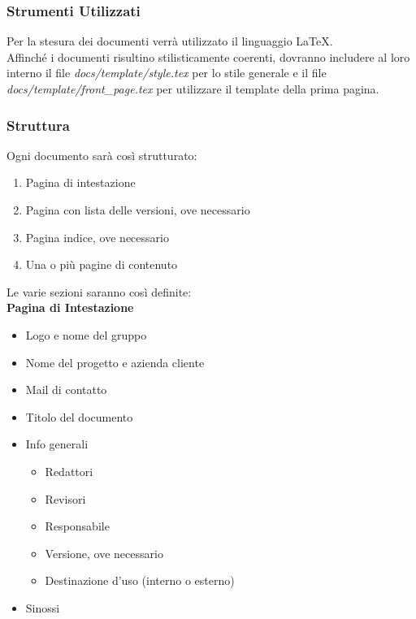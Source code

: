 \documentclass[a4paper, 12pt]{article}
\begin{document}
\subsubsection{Strumenti Utilizzati}
Per la stesura dei documenti verrà utilizzato il linguaggio \LaTeX. \\
Affinché i documenti risultino stilisticamente coerenti, dovranno includere al loro interno il file \textit{docs/template/style.tex} per lo stile generale e il file \textit{docs/template/front\_page.tex} per utilizzare il template della prima pagina.

\subsubsection{Struttura}
Ogni documento sarà così strutturato:
\begin{enumerate}
    \item Pagina di intestazione
    \item Pagina con lista delle versioni, ove necessario
    \item Pagina indice, ove necessario
    \item Una o più pagine di contenuto
\end{enumerate}

Le varie sezioni saranno così definite: \\

\textbf{Pagina di Intestazione} 
\begin{itemize}
    \item Logo e nome del gruppo
    \item Nome del progetto e azienda cliente
    \item Mail di contatto
    \item Titolo del documento
    \item Info generali
    \begin{itemize}
        \item Redattori
        \item Revisori
        \item Responsabile
        \item Versione, ove necessario
        \item Destinazione d'uso (interno o esterno)
    \end{itemize}
    \item Sinossi
\end{itemize}
\end{document}
